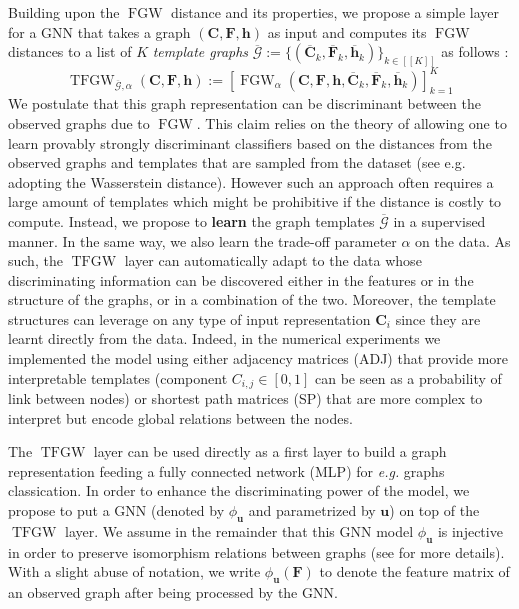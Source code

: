 \documentclass{article}
\def\vh{{\bm{h}}}
\def\vu{{\bm{u}}}
\def\mC{{\bm{C}}}
\def\mF{{\bm{F}}}
\newcommand{\FGW}{\operatorname{FGW}}
\newcommand{\TFGW}{\operatorname{TFGW}}
\newcommand{\integ}[1]{{[\![#1]\!]}}
\begin{document}
Building upon the $\FGW$ distance and its properties, we propose a simple layer for a GNN that takes a graph $\left(\mC, \mF, \vh \right)$ as
input and computes its $\FGW$ distances to a list of $K$ \emph{template graphs}
$\overline{\mathcal{G}}:=\{(\overline{\mC}_k, \overline{\mF}_k, \overline{\vh}_k)\}_{k \in \integ{K}}$
as follows :
\begin{equation}
	\TFGW_{\overline{\mathcal{G}},\alpha}\left(\mC, \mF, \vh \right) := \left[ \FGW_{\alpha}(\mC, \mF, \vh,  \overline{\mC}_k, \overline{\mF}_k, \overline{\vh}_k) \right]_{k=1}^K 
	\label{eq:tfgw}
\end{equation}
We postulate that this graph representation can be discriminant between the observed graphs due to $\FGW$. This claim relies on the theory of \cite{balcan2008theory} allowing one to learn provably strongly
discriminant classifiers based on the distances from the observed graphs and templates that are sampled from the dataset 
(see e.g. \cite{rakotomamonjy2018distance}  adopting the Wasserstein distance). However such an approach often requires a large
amount of templates which might be prohibitive if the distance is costly to
compute. Instead, we propose to {\bf learn} the graph templates $\overline{\mathcal{G}}$ in a supervised manner. In the same way, we also learn the trade-off parameter $\alpha$ on the data. As such, the $\TFGW$ layer can
automatically adapt to the data whose
discriminating information can be discovered either in the features or in the structure of the graphs, or in a combination of the two. Moreover, the template structures can leverage on any type of input representation $\mC_i$ since they are learnt directly from the data. Indeed, in the numerical experiments we implemented the model using either adjacency matrices (ADJ) that provide more interpretable templates (component $C_{i,j}\in[0,1]$ can be seen as a probability of link between nodes) or shortest path matrices (SP) that are more complex to interpret but encode global relations between the nodes. 
 

The $\TFGW$ layer can be used directly as a first layer to build a graph representation feeding a fully connected network (MLP) 
for \textit{e.g.} graphs classication. In order to enhance the discriminating power of the model, we propose to put a GNN (denoted by $\phi_{\vu}$ and parametrized by $\vu$) on top of the $\TFGW$ layer. We assume in the remainder that this GNN model $\phi_{\vu}$ is injective in order to preserve isomorphism relations between graphs (see \cite{xu2018powerful} for more details). With a slight abuse of notation, we write $\phi_{\vu}(\mathbf{F})$ to denote the feature matrix of an observed graph after being processed by the GNN. 
\end{document}
